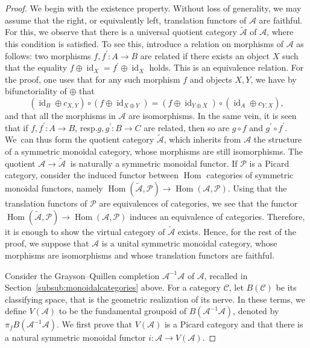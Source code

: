 \documentclass[11pt]{article}
\newcommand{\resp}{resp.\xspace}
\theoremstyle{plain}
\theoremstyle{definition}
\newcommand{\Acal}{\mathcal A}
\newcommand{\Ccal}{\mathcal C}
\newcommand{\Pcal}{\mathcal P}
\DeclareMathOperator{\Hom}{Hom}
\DeclareMathOperator{\id}{id}
\begin{document}
\begin{proof}
We begin with the existence property. Without loss of generality, we may assume that the right, or equivalently left, translation functors of $\Acal$ are faithful. For this, we observe that there is a universal quotient category $\widetilde{\Acal}$ of $\Acal$, where this condition is satisfied. To see this, introduce a relation on morphisms of $\Acal$ as follows: two morphisms $f,f^{\prime}\colon A\to B$ are related if there exists an object $X$ such that the equality $f\oplus\id_{X}=f^{\prime}\oplus\id_{X}$ holds. This is an equivalence relation. For the proof, one uses that for any such morphism $f$ and objects $X,Y$, we have by bifunctoriality of $\oplus$ that
\begin{displaymath}
(\id_{B}\oplus c_{X,Y})\circ (f\oplus\id_{X\oplus Y})=(f\oplus\id_{Y\oplus X})\circ (\id_{A}\oplus c_{Y,X}),
\end{displaymath}
and that all the morphisms in $\Acal$ are isomorphisms. In the same vein, it is seen that if $f, f^{\prime}\colon A\to B$, \resp $g,g^{\prime}\colon B\to C$ are related, then so are $g\circ f$ and $g^{\prime}\circ f^{\prime}$. We~can thus form the quotient category $\widetilde{\Acal}$, which inherits from $\Acal$ the structure of a symmetric monoidal category, whose morphisms are still isomorphisms. The quotient $\Acal\to\widetilde{\Acal}\ $ is naturally a symmetric monoidal functor. If $\Pcal$ is a Picard category, consider the induced functor between $\Hom$ categories of symmetric monoidal functors, namely $\Hom(\widetilde{\Acal},\Pcal)\to\Hom(\Acal,\Pcal)$. Using that the translation functors of $\Pcal$ are equivalences of categories, we see that the functor $\Hom(\widetilde{\Acal},\Pcal)\to\Hom(\Acal,\Pcal)$ induces an equivalence of categories. Therefore, it is enough to show the virtual category of $\widetilde{\Acal}$ exists. Hence, for the rest of the proof, we suppose that $\Acal$ is a unital symmetric monoidal category, whose morphisms are isomorphisms and whose translation functors are faithful.

Consider the Grayson--Quillen completion $\Acal^{-1} \Acal$ of $\Acal$, recalled in Section~\ref{subsub:monoidalcategories} above. For a category $\Ccal$, let $B(\Ccal)$ be its classifying space, that is the geometric realization of its nerve. In these terms, we define $V(\Acal)$ to be the fundamental groupoid of $B(\Acal^{-1} \Acal)$, denoted by $\pi_{f}B(\Acal^{-1} \Acal)$. We first prove that $V(\Acal)$ is a Picard category and that there is a natural symmetric monoidal functor $i: \Acal \to V(\Acal)$.


\end{proof}
\end{document}
